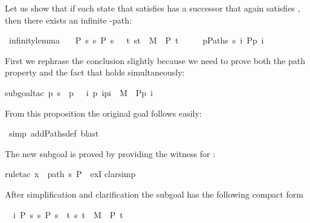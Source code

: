 \begin{isabellebody}
\begin{isamarkuptext}
Let us show that if each state  that satisfies 
has a successor that again satisfies , then there exists an infinite -path:%
\end{isamarkuptext}%
\ infinity{\isacharunderscore}lemma{\isacharcolon}\isanewline
\ \ {\isachardoublequote}{\isasymlbrakk}\ P\ s{\isacharsemicolon}\ {\isasymforall}s{\isachardot}\ P\ s\ {\isasymlongrightarrow}\ {\isacharparenleft}{\isasymexists}\ t{\isachardot}\ {\isacharparenleft}s{\isacharcomma}t{\isacharparenright}\ {\isasymin}\ M\ {\isasymand}\ P\ t{\isacharparenright}\ {\isasymrbrakk}\ {\isasymLongrightarrow}\isanewline
\ \ \ {\isasymexists}p{\isasymin}Paths\ s{\isachardot}\ {\isasymforall}i{\isachardot}\ P{\isacharparenleft}p\ i{\isacharparenright}{\isachardoublequote}%
\begin{isamarkuptxt}%
\noindent
First we rephrase the conclusion slightly because we need to prove both the path property
and the fact that  holds simultaneously:%
\end{isamarkuptxt}%
subgoal{\isacharunderscore}tac\ {\isachardoublequote}{\isasymexists}p{\isachardot}\ s\ {\isacharequal}\ p\ \ {\isasymand}\ {\isacharparenleft}{\isasymforall}i{\isachardot}\ {\isacharparenleft}p\ i{\isacharcomma}p{\isacharparenleft}i{\isacharplus}\ {\isasymin}\ M\ {\isasymand}\ P{\isacharparenleft}p\ i{\isacharparenright}{\isacharparenright}{\isachardoublequote}{\isacharparenright}%
\begin{isamarkuptxt}%
\noindent
From this proposition the original goal follows easily:%
\end{isamarkuptxt}%
\ simp\ add{\isacharcolon}Paths{\isacharunderscore}def{\isacharcomma}\ blast{\isacharparenright}%
\begin{isamarkuptxt}%
\noindent
The new subgoal is proved by providing the witness  for :%
\end{isamarkuptxt}%
rule{\isacharunderscore}tac\ x\ {\isacharequal}\ {\isachardoublequote}path\ s\ P{\isachardoublequote}\ \ exI{\isacharparenright}\isanewline
{}clarsimp{\isacharparenright}%
\begin{isamarkuptxt}%
\noindent
After simplification and clarification the subgoal has the following compact form
\begin{isabelle}
\ \ {\isasymAnd}i{\isachardot}\ {\isasymlbrakk}P\ s{\isacharsemicolon}\ {\isasymforall}s{\isachardot}\ P\ s\ {\isasymlongrightarrow}\ {\isacharparenleft}{\isasymexists}t{\isachardot}\ {\isacharparenleft}s{\isacharcomma}\ t{\isacharparenright}\ {\isasymin}\ M\ {\isasymand}\ P\ t{\isacharparenright}{\isasymrbrakk}\isanewline

\end{isabelle}
\end{isamarkuptxt}
\end{isabellebody}

